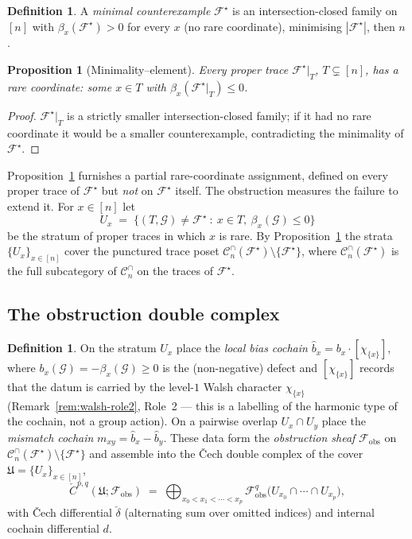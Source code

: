 \documentclass[11pt,oneside]{amsart}
\theoremstyle{plain}
\newtheorem{proposition}[theorem]{Proposition}
\theoremstyle{definition}
\newtheorem{definition}[theorem]{Definition}
\theoremstyle{remark}
\theoremstyle{honeststyle}
\newcommand{\F}{\mathcal{F}}
\newcommand{\G}{\mathcal{G}}
\newcommand{\Fstar}{\F^{\star}}
\newcommand{\bias}{\beta}
\newcommand{\Cn}{\mathcal{C}^{\cap}_n}
\newcommand{\fobs}{\mathcal{F}_{\mathrm{obs}}}
\newcommand{\walsh}[1]{\chi_{#1}}
\begin{document}
\begin{definition}
\label{def:minimal}
A \emph{minimal counterexample} $\Fstar$ is an intersection-closed
family on $[n]$ with $\bias_x(\Fstar)>0$ for every $x$ (no rare
coordinate), minimising $|\Fstar|$, then $n$.
\end{definition}

\begin{proposition}[Minimality--element]
\label{prop:minimality}
Every proper trace $\Fstar|_T$, $T\subsetneq[n]$, has a rare
coordinate: some $x\in T$ with $\bias_x(\Fstar|_T)\le0$.
\end{proposition}

\begin{proof}
$\Fstar|_T$ is a strictly smaller intersection-closed family; if it
had no rare coordinate it would be a smaller counterexample,
contradicting the minimality of $\Fstar$.
\end{proof}

Proposition~\ref{prop:minimality} furnishes a partial rare-coordinate
assignment, defined on every proper trace of $\Fstar$ but \emph{not}
on $\Fstar$ itself. The obstruction measures the failure to extend it.
For $x\in[n]$ let
\[
  U_x\;=\;\bigl\{(T,\G)\neq\Fstar\ :\ x\in T,\ \bias_x(\G)\le0\bigr\}
\]
be the stratum of proper traces in which $x$ is rare. By
Proposition~\ref{prop:minimality} the strata $\{U_x\}_{x\in[n]}$ cover
the punctured trace poset $\Cn(\Fstar)\setminus\{\Fstar\}$, where
$\Cn(\Fstar)$ is the full subcategory of $\Cn$ on the traces of
$\Fstar$.

\subsection{The obstruction double complex}
\label{ssec:obs-complex}

\begin{definition}
\label{def:obs-sheaf}
On the stratum $U_x$ place the \emph{local bias cochain}
$\widehat b_x=b_x\cdot[\walsh{\{x\}}]$, where $b_x(\G)=-\bias_x(\G)\ge0$
is the (non-negative) defect and $[\walsh{\{x\}}]$ records that the
datum is carried by the level-$1$ Walsh character $\walsh{\{x\}}$
(Remark~\ref{rem:walsh-role2}, Role~2 --- this is a labelling of the
harmonic type of the cochain, not a group action). On a pairwise
overlap $U_x\cap U_y$ place the \emph{mismatch cochain}
$m_{xy}=\widehat b_x-\widehat b_y$. These data form the
\emph{obstruction sheaf} $\fobs$ on $\Cn(\Fstar)\setminus\{\Fstar\}$
and assemble into the \v{C}ech double complex of the cover
$\mathfrak U=\{U_x\}_{x\in[n]}$,
\[
  \check C^{p,q}(\mathfrak U;\fobs)\;=\;
  \bigoplus_{x_0<x_1<\cdots<x_p}\fobs^{q}\bigl(U_{x_0}\cap\cdots\cap
  U_{x_p}\bigr),
\]
with \v{C}ech differential $\check\delta$ (alternating sum over
omitted indices) and internal cochain differential $d$.
\end{definition}
\end{document}
